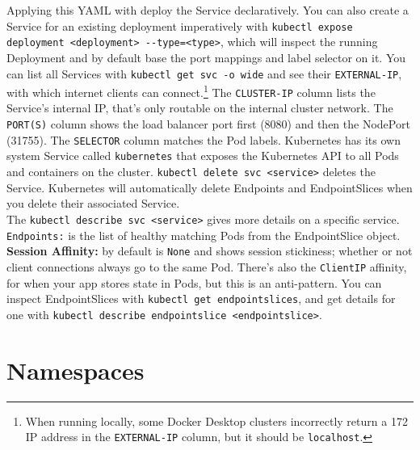 \documentclass[8pt, table, xcdraw]{article}%
\begin{document}
Applying this YAML with deploy the Service declaratively. You can also create a Service for an existing deployment imperatively with \lstinline{kubectl expose deployment <deployment> --type=<type>}, which will inspect the running Deployment and by default base the port mappings and label selector on it. You can list all Services with \lstinline{kubectl get svc -o wide} and see their \lstinline{EXTERNAL-IP}, with which internet clients can connect.\footnote{When running locally, some Docker Desktop clusters incorrectly return a 172 IP address in the \lstinline{EXTERNAL-IP} column, but it should be \lstinline{localhost}.} The \lstinline{CLUSTER-IP} column lists the Service’s internal IP, that’s only routable on the internal cluster network. The \lstinline{PORT(S)} column shows the load balancer port first (8080) and then the NodePort (31755). The \lstinline{SELECTOR} column matches the Pod labels. Kubernetes has its own system Service called \lstinline{kubernetes} that exposes the Kubernetes API to all Pods and containers on the cluster. \lstinline{kubectl delete svc <service>} deletes the Service. Kubernetes will automatically delete Endpoints and EndpointSlices when you delete their associated Service.\\
The \lstinline{kubectl describe svc <service>} gives more details on a specific service. \lstinline{Endpoints:} is the list of healthy matching Pods from the EndpointSlice object. \textbf{Session Affinity:} by default is \lstinline{None} and shows session stickiness; whether or not client connections always go to the same Pod. There's also the \lstinline{ClientIP} affinity, for when your app stores state in Pods, but this is an anti-pattern. You can inspect EndpointSlices with \lstinline{kubectl get endpointslices}, and get details for one with \lstinline{kubectl describe endpointslice <endpointslice>}.

\section{Namespaces}
\end{document}
